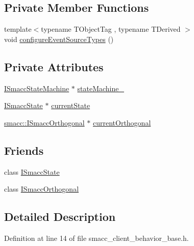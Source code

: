 \subsection*{Private Member Functions}
\begin{DoxyCompactItemize}
\item 
{\footnotesize template$<$typename T\+Object\+Tag , typename T\+Derived $>$ }\\void \hyperlink{classsmacc_1_1ISmaccClientBehavior_a9796c1ad9ee332b873813063fc93cb9a}{configure\+Event\+Source\+Types} ()
\end{DoxyCompactItemize}
\subsection*{Private Attributes}
\begin{DoxyCompactItemize}
\item 
\hyperlink{classsmacc_1_1ISmaccStateMachine}{I\+Smacc\+State\+Machine} $\ast$ \hyperlink{classsmacc_1_1ISmaccClientBehavior_a0fea65db292a8bb3dfba3e5840491d79}{state\+Machine\+\_\+}
\item 
\hyperlink{classsmacc_1_1ISmaccState}{I\+Smacc\+State} $\ast$ \hyperlink{classsmacc_1_1ISmaccClientBehavior_a5a6658a2deb72b700ae595e594617616}{current\+State}
\item 
\hyperlink{classsmacc_1_1ISmaccOrthogonal}{smacc\+::\+I\+Smacc\+Orthogonal} $\ast$ \hyperlink{classsmacc_1_1ISmaccClientBehavior_a0d606b804769a11b4f672243a014bed8}{current\+Orthogonal}
\end{DoxyCompactItemize}
\subsection*{Friends}
\begin{DoxyCompactItemize}
\item 
class \hyperlink{classsmacc_1_1ISmaccClientBehavior_ab907e4cdbf326246355f56640780162e}{I\+Smacc\+State}
\item 
class \hyperlink{classsmacc_1_1ISmaccClientBehavior_a7205cc84a71fea903124d54d01e99a68}{I\+Smacc\+Orthogonal}
\end{DoxyCompactItemize}


\subsection{Detailed Description}


Definition at line 14 of file smacc\+\_\+client\+\_\+behavior\+\_\+base.\+h.



